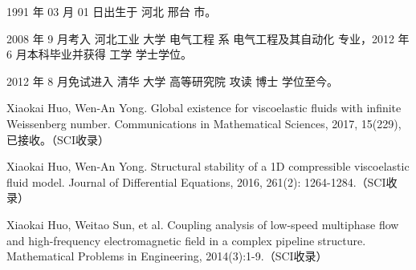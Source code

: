 \begin{resume}


  1991 年 03 月 01 日出生于 河北 邢台 市。

  2008 年 9 月考入 河北工业 大学  电气工程 系 电气工程及其自动化 专业，2012 年 6 月本科毕业并获得 工学 学士学位。

  2012 年 8 月免试进入 清华 大学 高等研究院 攻读 博士 学位至今。


  \begin{publications}
  \item Xiaokai Huo, Wen-An Yong. Global existence for viscoelastic fluids with infinite Weissenberg number. Communications in Mathematical Sciences, 2017, 15(229), 已接收。（SCI收录）
  \item Xiaokai Huo, Wen-An Yong. Structural stability of a 1D compressible viscoelastic fluid model. Journal of Differential Equations, 2016, 261(2): 1264-1284.（SCI收录）
  \item Xiaokai Huo, Weitao Sun, et al. Coupling analysis of low-speed multiphase flow and high-frequency electromagnetic field in a complex pipeline structure. Mathematical Problems in Engineering, 2014(3):1-9.（SCI收录）
  \end{publications}

\end{resume}
